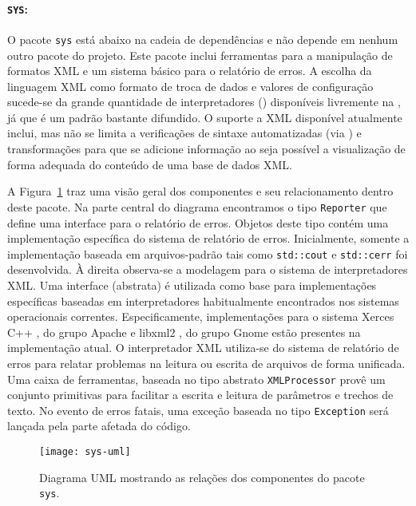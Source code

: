 \paragraph{\texttt{SYS}:} O pacote \texttt{sys} está abaixo na cadeia de
dependências e não depende em nenhum outro pacote do projeto. Este pacote
inclui ferramentas para a manipulação de formatos XML e um sistema básico para
o relatório de erros. A escolha da linguagem XML como formato de troca de
dados e valores de configuração sucede-se da grande quantidade de
interpretadores () disponíveis livremente na , já
que é um padrão bastante difundido. O suporte a XML disponível atualmente
inclui, mas não se limita a verificações de sintaxe automatizadas (via
) e transformações para que se adicione informação ao seja
possível a visualização de forma adequada do conteúdo de uma base de dados
XML.

A Figura~\ref{fig:sys-uml} traz uma visão geral dos componentes e seu
relacionamento dentro deste pacote. Na parte central do diagrama encontramos o
tipo \texttt{Reporter} que define uma interface para o relatório de
erros. Objetos deste tipo contém uma implementação específica do sistema de
relatório de erros. Inicialmente, somente a implementação baseada em
arquivos-padrão tais como \texttt{std::cout} e \texttt{std::cerr}
\cite{web:gcc-stl} foi desenvolvida. À direita observa-se a modelagem para o
sistema de interpretadores XML. Uma interface (abstrata) é utilizada como base
para implementações específicas baseadas em interpretadores habitualmente
encontrados nos sistemas operacionais correntes. Especificamente,
implementações para o sistema Xerces C++ \cite{xerces-c}, do grupo Apache e
libxml2 \cite{libxml2}, do grupo Gnome estão presentes na implementação
atual. O interpretador XML utiliza-se do sistema de relatório de erros para
relatar problemas na leitura ou escrita de arquivos de forma unificada. Uma
caixa de ferramentas, baseada no tipo abstrato \texttt{XMLProcessor} provê um
conjunto primitivas para facilitar a escrita e leitura de parâmetros e trechos
de texto. No evento de erros fatais, uma exceção baseada no tipo
\texttt{Exception} será lançada pela parte afetada do código.

\begin{figure}
\begin{center}
\texttt{[image: sys-uml]}
\end{center}
\caption{Diagrama UML mostrando as relações dos componentes do pacote
\texttt{sys}.}
\label{fig:sys-uml}
\end{figure}

